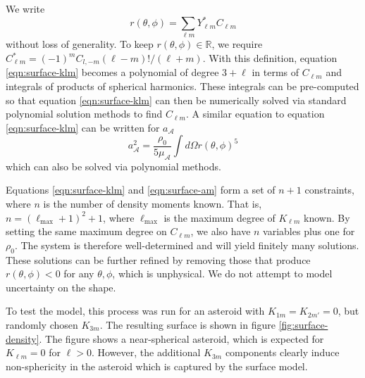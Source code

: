 \documentclass[fleqn,usenatbib]{mnras}
\begin{document}
We write 
\begin{equation}
  r(\theta, \phi) = \sum_{\ell m} Y_{\ell m}^* C_{\ell m}
\end{equation}
without loss of generality. To keep $r(\theta, \phi) \in \mathds{R}$, we require $C_{\ell m}^* = (-1)^m C_{l,-m} (\ell-m)!/(\ell+m)$. With this definition, equation \ref{eqn:surface-klm} becomes a polynomial of degree $3+\ell$ in terms of $C_{\ell m}$ and integrals of products of spherical harmonics. These integrals can be pre-computed so that equation \ref{eqn:surface-klm} can then be numerically solved via standard polynomial solution methods to find $C_{\ell m}$. A similar equation to equation \ref{eqn:surface-klm} can be written for $a_\mathcal{A}$
\begin{equation}
  a_\mathcal{A}^2 = \frac{\rho_0}{5\mu_\mathcal{A}}\int d\Omega r(\theta, \phi)^5
  \label{eqn:surface-am}
\end{equation}
which can also be solved via polynomial methods.

Equations \ref{eqn:surface-klm} and \ref{eqn:surface-am} form a set of $n+1$ constraints, where $n$ is the number of density moments known. That is, $n=(\ell_\text{max}+1)^2+1$, where $\ell_\text{max}$ is the maximum degree of $K_{\ell m}$ known. By setting the same maximum degree on $C_{\ell m}$, we also have $n$ variables plus one for $\rho_0$. The system is therefore well-determined and will yield finitely many solutions. These solutions can be further refined by removing those that produce $r(\theta, \phi) < 0$ for any $\theta, \phi$, which is unphysical. We do not attempt to model uncertainty on the shape.

To test the model, this process was run for an asteroid with $K_{1m}=K_{2m'}=0$, but randomly chosen $K_{3m}$. The resulting surface is shown in figure \ref{fig:surface-density}. The figure shows a near-spherical asteroid, which is expected for $K_{\ell m} = 0$ for $\ell > 0$. However, the additional $K_{3m}$ components clearly induce non-sphericity in the asteroid which is captured by the surface model.
\end{document}
